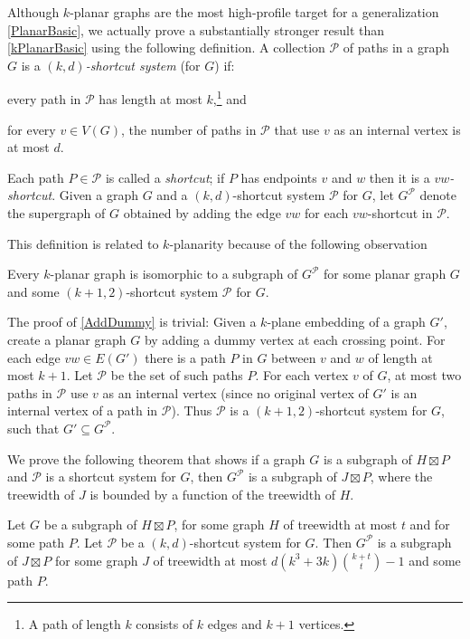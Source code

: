 \documentclass{patmorin}
\newcommand{\PP}{\mathcal{P}}
\begin{document}
Although $k$-planar graphs are the most high-profile target for a generalization \cref{PlanarBasic}, we actually prove a substantially stronger result than \cref{kPlanarBasic} using the following definition. A collection $\mathcal{P}$ of paths in a graph $G$ is a \emph{$(k,d)$-shortcut system} (for $G$) if:
\begin{compactitem}
\item every path in $\mathcal{P}$ has length at most $k$,\footnote{A path of length $k$ consists of $k$ edges and $k+1$ vertices.} and
\item for every $v\in V(G)$, the number of paths in $\mathcal{P}$ that use $v$ as an internal vertex is at most $d$.
\end{compactitem} 
Each path $P\in\mathcal{P}$ is called a \emph{shortcut}; if $P$ has endpoints $v$ and $w$ then it is a \emph{$vw$-shortcut}. Given a graph $G$ and a $(k,d)$-shortcut system $\mathcal{P}$ for $G$, let $G^{\mathcal{P}}$ denote the supergraph of $G$ obtained by adding the edge $vw$ for each $vw$-shortcut in $\mathcal{P}$. 

This definition is related to $k$-planarity because of the following observation 

\begin{obs}
\label{AddDummy}
Every $k$-planar graph is isomorphic to a subgraph of $G^\PP$ for some planar graph $G$ and some $(k+1,2)$-shortcut system $\PP$ for $G$. 
\end{obs}

The proof of \cref{AddDummy} is trivial: Given a $k$-plane embedding of a graph $G'$, create a planar graph $G$ by adding a dummy vertex at each crossing point. For each edge $vw\in E(G')$ there is a path $P$ in $G$ between $v$ and $w$ of length at most $k+1$. Let $\PP$ be the set of such paths $P$. For each vertex $v$ of $G$, at most two paths in $\PP$ use $v$ as an internal vertex (since no original vertex of $G'$ is an internal vertex of a path in $\PP$). Thus $\PP$ is a $(k+1,2)$-shortcut system for $G$, such that $G'\subseteq G^\PP$. 

We prove the following theorem that shows if a graph $G$ is a subgraph of $H\boxtimes P$ and $\PP$ is a shortcut system for $G$, then $G^{\mathcal{P}}$ is a subgraph of $J\boxtimes P$, where the treewidth of $J$ is bounded by a function of the treewidth of $H$. 

\begin{thm}
\label{ShortcutProduct}
Let $G$ be a subgraph of $H\boxtimes P$, for some graph $H$ of treewidth at most $t$ and for some path $P$. 
Let $\PP$ be a $(k,d)$-shortcut system for $G$. Then $G^\PP$ is a subgraph of $J\boxtimes P$ for some graph $J$ of treewidth at most $d(k^3+3k)\binom{k+t}{t}-1$ and some path $P$. 
\end{thm}
\end{document}
